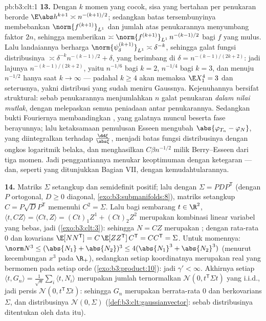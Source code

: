 \begin{solution}{pb:b3:clt:1}
\textbf{13.} Dengan $k$ momen yang cocok, sisa yang bertahan
per penukaran berorde $\E\abs h^{k+1} \asymp
n^{-(k+1)/2}$; sedangkan batas  tersembunyinya membebankan
$\norm{f^{(k+1)}}_{L^1}$ dan jumlah atas penukarannya menyumbang
faktor $2n$, sehingga memberikan $\asymp\norm{f^{(k+1)}}_{L^1}\,
n^{-(k-1)/2}$ bagi $f$ yang mulus. Lalu landaiannya berharga
$\norm{\psi_\delta^{(k+1)}}_{L^1} \asymp \delta^{-k}$, sehingga
galat fungsi distribusinya $\asymp
\delta^{-k}n^{-(k-1)/2} + \delta$, yang berimbang di $\delta =
n^{-(k-1)/(2k+2)}$: jadi lajunya $n^{-(k-1)/(2k+2)}$, yaitu
$n^{-1/6}$ bagi $k = 2$, $n^{-1/4}$ bagi $k = 3$, dan menuju
$n^{-1/2}$ hanya saat $k \to \infty$ --- padahal $k \geq 4$
akan memaksa $\E X_1^4 = 3$ dan seterusnya, yakni distribusi yang
sudah meniru Gaussnya. Kejenuhannya bersifat
struktural: sebab penukarannya menjumlahkan $n$ galat penukaran \emph{dalam
nilai mutlak}, dengan melepaskan semua peniadaan antar
penukarannya. Sedangkan bukti Fouriernya membandingkan ,
yang galatnya muncul beserta fase berayunnya;
lalu ketaksamaan pemulusan Esseen mengubah $\abs{\varphi_{T_n}
- \varphi_N}$, yang diintegralkan terhadap $\frac{\dd\xi}{\abs\xi}$,
menjadi batas fungsi distribusinya dengan ongkos logaritmik
belaka, dan menghasilkan $C\beta n^{-1/2}$ milik Berry--Esseen dari
tiga momen. Jadi penggantiannya menukar keoptimuman dengan
ketegaran --- dan, seperti yang ditunjukkan Bagian VII, dengan kemudahtularannya.

\textbf{14.} Matriks $\Sigma$ setangkup dan semidefinit positif;
lalu dengan $\Sigma = PDP^{\mathsf T}$ (dengan $P$ ortogonal, $D \geq 0$
diagonal, \cref{exo:b3:submanifolds:8}), matriks setangkup $C =
P\sqrt DP^{\mathsf T}$ memenuhi $C^2 = \Sigma$. Lalu bagi sembarang $t
\in \R^2$, $\langle t, CZ\rangle = \langle Ct, Z\rangle =
(Ct)_1Z^1 + (Ct)_2Z^2$ merupakan kombinasi linear variabel
 yang bebas, jadi 
(\cref{exo:b3:clt:3}): sehingga $N = CZ$ merupakan ; dengan
rata-rata $0$ dan kovarians $\E[NN^{\mathsf T}] =
C\,\E[ZZ^{\mathsf T}]\,C^{\mathsf T} = CC^{\mathsf T} =
\Sigma$. Untuk momennya: $\norm N^3 \leq (\abs{N_1} +
\abs{N_2})^3 \leq 4(\abs{N_1}^3 + \abs{N_2}^3)$ (menurut kecembungan
$x^3$ pada $\R_+$), sedangkan setiap koordinatnya merupakan
 real yang bermomen pada setiap orde
(\cref{exo:b3:product:10}): jadi $\gamma' < \infty$. Akhirnya
setiap $\langle t, G_n\rangle = \frac1{\sqrt
n}\sum_i\langle t, N_i\rangle$ merupakan jumlah ternormalkan
$\mathcal N(0, t^{\mathsf T}\Sigma t)$ yang i.i.d., jadi
persis $\mathcal N(0, t^{\mathsf T}\Sigma t)$: sehingga $G_n$ merupakan
 berrata-rata $0$ dan berkovarians $\Sigma$, dan
distribusinya $\mathcal N(0, \Sigma)$
(\cref{def:b3:clt:gaussianvector}: sebab distribusinya ditentukan
oleh data itu).


\end{solution}
